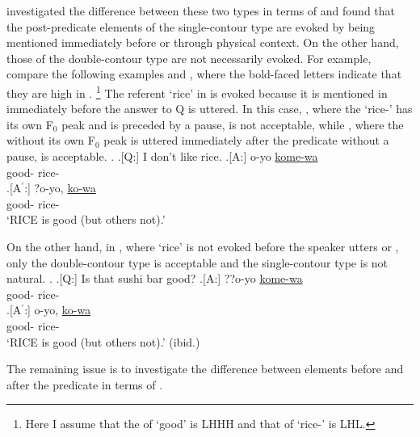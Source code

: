  investigated the difference between these two types in terms of  and found that
the post-predicate elements of the single-contour type are evoked
by being mentioned immediately before or through physical context.
On the other hand,
those of the double-contour type are not necessarily evoked.
For example, compare the following examples \Next and \NNext,
where the bold-faced letters indicate that
they are high in .%
	\footnote{
	Here I assume that the  of  `good' is LHHH
	and that of  `rice-' is LHL.
	}
The referent `rice' in \Next is evoked
because it is mentioned in \Next[Q] immediately before the answer to Q is uttered.
In this case,
\Next[A$^{\prime}$],
where the   `rice-' has its own F$_{0}$ peak and is preceded by a pause,
is not acceptable,
while \Next[A],
where the  without its own F$_{0}$ peak is uttered immediately after the predicate without a pause,
is acceptable.
%
\ex. 
 \a.[Q:] I don't like rice.
	\bg.[A:] o-yo \ul{kome-wa} \\
			good- rice- \\
	\bg.[A$^{\prime}$:] ?o-yo, \ul{ko-wa} \\
			good- rice- \\
			`RICE is good (but others not).'
			\hfill{\cite[][7]{nakagawaetal08_paper}}

On the other hand,
in \Next, where `rice' is not evoked before the speaker utters \Next[A] or \Next[A$^{\prime}$],
only the double-contour type \Next[A$^{\prime}$] is acceptable
and the single-contour type \Next[A] is not natural.
\ex. 
 \a.[Q:] Is that sushi bar good?
	\bg.[A:] ??o-yo \ul{kome-wa} \\
			good- rice- \\
	\bg.[A$^{\prime}$:] o-yo, \ul{ko-wa} \\
			good- rice- \\
			`RICE is good (but others not).'
			\hfill{(ibid.)}

The remaining issue is
to investigate the difference between elements before and after the predicate in terms of .

